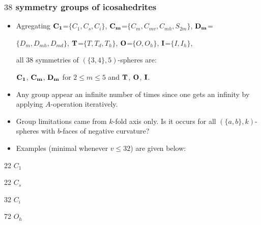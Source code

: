 \documentclass{beamer}
\begin{document}
\begin{frame}\frametitle{$38$ symmetry groups of icosahedrites}
\begin{itemize}
\item Agregating  
 \textcolor{red}{${\bf C_1}$}=$\{C_1,C_s,C_i\}$,
\textcolor{red}{${\bf C_m}$}=$\{C_m,C_{mv},C_{mh},S_{2m}\}$,
 \textcolor{red}{${\bf D_m}$}=
 
$\{D_m,D_{mh},D_{md}\}$,
 \textcolor{red}{${\bf T}$}=$\{T,T_d,T_h\}$, \textcolor{red}{${\bf O}$}=$\{O,O_h\}$, 
\textcolor{red}{${\bf I}$}=$\{I,I_h\}$,

all $38$ symmetries of $(\{3,4\},5)$-spheres are: 

${\bf C_1}$,  ${\bf C_m}$,  ${\bf D_m}$ for $2$$\le$$ m$$\le$$5$ and  ${\bf 
T}$,  
${\bf O}$, ${\bf I}$.
\item Any group appear an infinite number of times since one gets an 
infinity 
by applying $A$-operation iteratively.


\item Group limitations came from $k$-fold axis only.
Is it  occurs for all $(\{a,b\},k)$-spheres
with $b$-faces of negative curvature?


\item Examples (minimal whenever $v\le 32$) are given below:


\end{itemize}

\begin{center}
\begin{minipage}[b]{22mm}
\centering
{}\par
 22 
$C_{1}$ 
\end{minipage}
\begin{minipage}[b]{22mm}
\centering
{}\par
 22 $C_{s}$  
\end{minipage}
\begin{minipage}[b]{22mm}
\centering
{}\par
32 $C_i$ 
\end{minipage}
\begin{minipage}[b]{22mm}\centering
{}\par
72 $O_{h}$
\end{minipage}
\end{center}
\end{frame}
\end{document}
